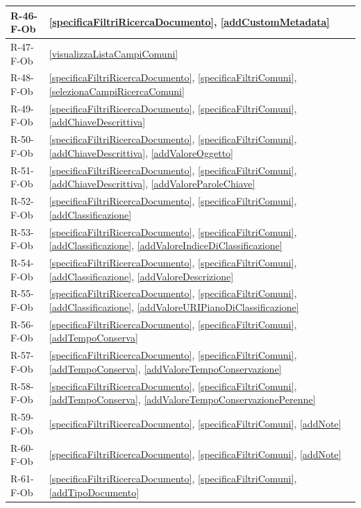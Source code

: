 \begin{longtable}{|p{4cm}|p{10cm}|}
\hline
R-46-F-Ob & \ref{specificaFiltriRicercaDocumento}, \ref{addCustomMetadata} \\
\hline
R-47-F-Ob & \ref{visualizzaListaCampiComuni} \\
\hline
R-48-F-Ob & \ref{specificaFiltriRicercaDocumento}, \ref{specificaFiltriComuni}, \ref{selezionaCampiRicercaComuni} \\
\hline
R-49-F-Ob & \ref{specificaFiltriRicercaDocumento}, \ref{specificaFiltriComuni}, \ref{addChiaveDescrittiva} \\
\hline
R-50-F-Ob & \ref{specificaFiltriRicercaDocumento}, \ref{specificaFiltriComuni}, \ref{addChiaveDescrittiva}, \ref{addValoreOggetto} \\
\hline
R-51-F-Ob & \ref{specificaFiltriRicercaDocumento}, \ref{specificaFiltriComuni}, \ref{addChiaveDescrittiva}, \ref{addValoreParoleChiave} \\
\hline
R-52-F-Ob & \ref{specificaFiltriRicercaDocumento}, \ref{specificaFiltriComuni}, \ref{addClassificazione} \\
\hline
R-53-F-Ob & \ref{specificaFiltriRicercaDocumento}, \ref{specificaFiltriComuni}, \ref{addClassificazione}, \ref{addValoreIndiceDiClassificazione} \\
\hline
R-54-F-Ob & \ref{specificaFiltriRicercaDocumento}, \ref{specificaFiltriComuni}, \ref{addClassificazione}, \ref{addValoreDescrizione} \\
\hline
R-55-F-Ob & \ref{specificaFiltriRicercaDocumento}, \ref{specificaFiltriComuni}, \ref{addClassificazione}, \ref{addValoreURIPianoDiClassificazione} \\
\hline
R-56-F-Ob & \ref{specificaFiltriRicercaDocumento}, \ref{specificaFiltriComuni}, \ref{addTempoConserva} \\
\hline
R-57-F-Ob & \ref{specificaFiltriRicercaDocumento}, \ref{specificaFiltriComuni}, \ref{addTempoConserva}, \ref{addValoreTempoConservazione} \\
\hline
R-58-F-Ob & \ref{specificaFiltriRicercaDocumento}, \ref{specificaFiltriComuni}, \ref{addTempoConserva}, \ref{addValoreTempoConservazionePerenne} \\
\hline
R-59-F-Ob & \ref{specificaFiltriRicercaDocumento}, \ref{specificaFiltriComuni}, \ref{addNote} \\
\hline
R-60-F-Ob & \ref{specificaFiltriRicercaDocumento}, \ref{specificaFiltriComuni}, \ref{addNote} \\
\hline
R-61-F-Ob & \ref{specificaFiltriRicercaDocumento}, \ref{specificaFiltriComuni}, \ref{addTipoDocumento} \\

\end{longtable}

